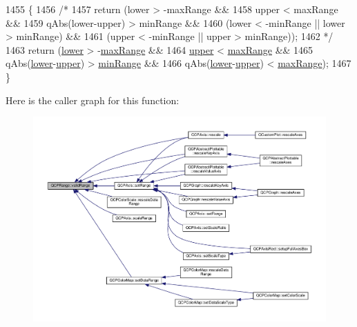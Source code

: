 \begin{DoxyCode}
1455 \{
1456   \textcolor{comment}{/*}
1457 \textcolor{comment}{  return (lower > -maxRange &&}
1458 \textcolor{comment}{          upper < maxRange &&}
1459 \textcolor{comment}{          qAbs(lower-upper) > minRange &&}
1460 \textcolor{comment}{          (lower < -minRange || lower > minRange) &&}
1461 \textcolor{comment}{          (upper < -minRange || upper > minRange));}
1462 \textcolor{comment}{          */}
1463   \textcolor{keywordflow}{return} (\hyperlink{class_q_c_p_range_aa3aca3edb14f7ca0c85d912647b91745}{lower} > -\hyperlink{class_q_c_p_range_a5ca51e7a2dc5dc0d49527ab171fe1f4f}{maxRange} &&
1464           \hyperlink{class_q_c_p_range_ae44eb3aafe1d0e2ed34b499b6d2e074f}{upper} < \hyperlink{class_q_c_p_range_a5ca51e7a2dc5dc0d49527ab171fe1f4f}{maxRange} &&
1465           qAbs(\hyperlink{class_q_c_p_range_aa3aca3edb14f7ca0c85d912647b91745}{lower}-\hyperlink{class_q_c_p_range_ae44eb3aafe1d0e2ed34b499b6d2e074f}{upper}) > \hyperlink{class_q_c_p_range_ab46d3bc95030ee25efda41b89e2b616b}{minRange} &&
1466           qAbs(\hyperlink{class_q_c_p_range_aa3aca3edb14f7ca0c85d912647b91745}{lower}-\hyperlink{class_q_c_p_range_ae44eb3aafe1d0e2ed34b499b6d2e074f}{upper}) < \hyperlink{class_q_c_p_range_a5ca51e7a2dc5dc0d49527ab171fe1f4f}{maxRange});
1467 \}
\end{DoxyCode}


Here is the caller graph for this function\+:\nopagebreak
\begin{figure}[H]
\begin{center}
\leavevmode
\includegraphics[width=350pt]{class_q_c_p_range_ab38bd4841c77c7bb86c9eea0f142dcc0_icgraph}
\end{center}
\end{figure}


